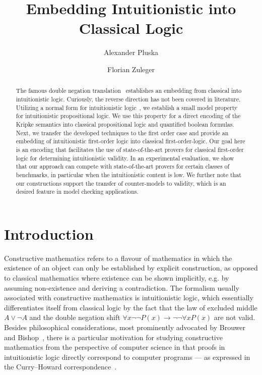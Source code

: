 \documentclass[runningheads]{llncs}
\begin{document}
	\title{Embedding Intuitionistic into Classical Logic}
	\author{Alexander Pluska \and Florian Zuleger}
	\maketitle
\begin{abstract}
The famous double negation translation~\cite{glivenko1929quelques,godel1933intuitionistischen} establishes an embedding from classical into intuitionistic logic.
Curiously, the reverse direction has not been covered in literature.
Utilizing a normal form for intuitionistic logic~\cite{claessen2015sat}, we establish a small model property for intuitionistic propositional logic.
We use this property for a direct encoding of the Kripke semantics into classical propositional logic and quantified boolean formulas.
Next, we transfer the developed techniques to the first order case and provide an embedding of intuitionistic first-order logic into classical first-order-logic.
Our goal here is an encoding that facilitates the use of state-of-the-art provers for classical first-order logic for determining intuitionistic validity.
In an experimental evaluation, we show that our approach can compete with state-of-the-art provers for certain classes of benchmarks, in particular when the intuitionistic content is low.
We further note that our constructions support the transfer of counter-models to validity, which is an desired feature in model checking applications.
\end{abstract}

\section{Introduction}

Constructive mathematics refers to a flavour of mathematics in which the existence of an object can only be established by explicit construction, as opposed to classical mathematics where existence can be shown implicitly, e.g. by assuming non-existence and deriving a contradiction.
The formalism usually associated with constructive mathematics is intuitionistic logic, which essentially differentiates itself from classical logic by the fact that the law of excluded middle $A\vee\neg A$ and the double negation shift $\forall x\neg\neg P(x)\to\neg\neg\forall xP(x)$ are not valid.
Besides philosophical considerations, most prominently advocated by Brouwer~\cite{brouwer1907over} and Bishop~\cite{bishop1967foundations}, there is a particular motivation for studying constructive mathematics from the perspective of computer science in that proofs in intuitionistic logic directly correspond to computer programs --- as expressed in the Curry--Howard correspondence~\cite{howard1980formulae}.
\end{document}

